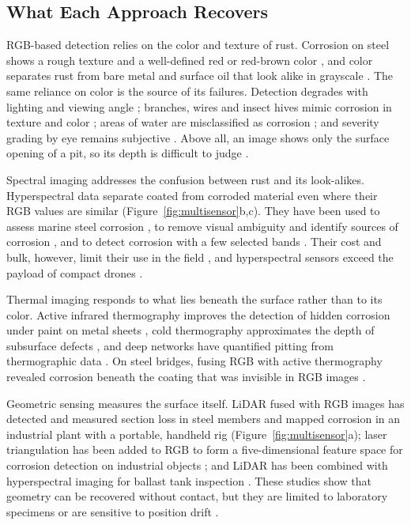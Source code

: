 \subsection{What Each Approach Recovers}

RGB-based detection relies on the color and texture of rust. Corrosion on steel
shows a rough texture and a well-defined red or red-brown color \citep{Rahman2021,HerndonTien2025}, and
color separates rust from bare metal and surface oil that look alike in
grayscale \citep{Hu2023}. The same reliance on color is the source of its failures.
Detection degrades with lighting and viewing angle \citep{Hu2023,Yu2023,HerndonTien2025}; branches,
wires and insect hives mimic corrosion in texture and color \citep{HerndonTien2025}; areas of
water are misclassified as corrosion \citep{Rahman2021}; and severity grading by eye remains
subjective \citep{Li2024b}. Above all, an image shows only the surface opening of a pit,
so its depth is difficult to judge \citep{Suzuki2026}.

Spectral imaging addresses the confusion between rust and its look-alikes.
Hyperspectral data separate coated from corroded material even where their RGB
values are similar \citep{PallasEnguita2025} (Figure~\ref{fig:multisensor}b,c). They have been used to assess marine steel
corrosion \citep{Arias2025}, to remove visual ambiguity and identify sources of corrosion
\citep{Lavadiya2022}, and to detect corrosion with a few selected bands \citep{Hernndez-Surez2026}. Their cost and bulk, however, limit
their use in the field \citep{Tang2025}, and hyperspectral sensors exceed the payload of
compact drones \citep{PallasEnguita2025}.

Thermal imaging responds to what lies beneath the surface rather than to its
color. Active infrared thermography improves the detection of hidden corrosion
under paint on metal sheets \citep{Elizalde2023}, cold thermography approximates the depth of
subsurface defects \citep{Doshvarpassand2022}, and deep networks have quantified pitting from
thermographic data \citep{Liu2021}. On steel bridges, fusing RGB with active thermography
revealed corrosion beneath the coating that was invisible in RGB images \citep{Lim2021}.

Geometric sensing measures the surface itself. LiDAR fused with RGB images has
detected and measured section loss in steel members \citep{Maru2025} and mapped corrosion
in an industrial plant with a portable, handheld rig \citep{PimenteldeFigueiredo2025} (Figure~\ref{fig:multisensor}a); laser triangulation
has been added to RGB to form a five-dimensional feature space for corrosion
detection on industrial objects \citep{Haitz2022}; and LiDAR has been combined with
hyperspectral imaging for ballast tank inspection \citep{PallasEnguita2025}. These studies show
that geometry can be recovered without contact, but they are limited to
laboratory specimens \citep{Maru2025,PallasEnguita2025} or are sensitive to position drift \citep{PimenteldeFigueiredo2025}.


